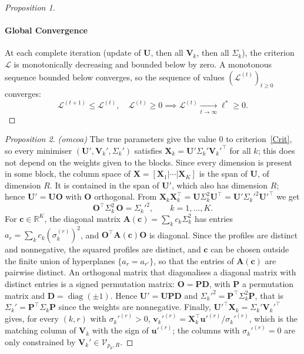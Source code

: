 \documentclass[11pt]{article}
\DeclareMathOperator{\diag}{diag}
\newcommand{\X}{\mathbf{X}}
\newcommand{\U}{\mathbf{U}}
\newcommand{\V}{\mathbf{V}}
\newcommand{\uu}{\mathbf{u}}
\newcommand{\vv}{\mathbf{v}}
\newcommand{\Stiefel}[2]{\mathcal V_{#1,#2}}
\begin{document}
\begin{proof}[Proposition 1]
\paragraph{Global Convergence} At each complete iteration (update of $\U$, then all $\V_k$, then all $\Sigma_k$), the criterion $\mathcal{L}$ is monotonically decreasing and bounded below by zero. A monotonous sequence bounded below converges, so the sequence of values $(\mathcal{L}^{(t)})_{t \geq 0}$
converges:
\[
  \mathcal{L}^{(t+1)} \leq \mathcal{L}^{(t)}, \quad \mathcal{L}^{(t)} \geq 0
  \implies
  \mathcal{L}^{(t)} \xrightarrow[t \to \infty]{} \ell^* \geq 0.
\]
\end{proof}

\begin{proof}[Proposition 2]
\emph{(omcoa)} The true parameters give the value $0$ to criterion~\eqref{Crit}, so
every minimiser $(\U',\V_k',\Sigma_k')$ satisfies
$\X_k=\U'\Sigma_k'\V_k'^\intercal$ for all $k$; this does not depend on the
weights given to the blocks. Since every dimension is present in some block,
the column space of $\X=[\X_1|\cdots|\X_K]$ is the span of $\U$, of dimension
$R$. It is contained in the span of $\U'$, which also has dimension $R$; hence
$\U'=\U\mathbf O$ with $\mathbf O$ orthogonal. From
$\X_k\X_k^\intercal=\U\Sigma_k^2\U^\intercal=\U'\Sigma_k'^2\U'^\intercal$ we get
\[
  \mathbf O^\intercal\Sigma_k^2\,\mathbf O=\Sigma_k'^2,\qquad k=1,\ldots,K .
\]
For $\mathbf c\in\mathbb R^K$, the diagonal matrix
$\mathbf A(\mathbf c)=\sum_k c_k\Sigma_k^2$ has entries
$a_r=\sum_k c_k(\sigma_k^{(r)})^2$, and $\mathbf O^\intercal\mathbf A(\mathbf c)\mathbf O$
is diagonal. Since the profiles are distinct and nonnegative, the squared
profiles are distinct, and $\mathbf c$ can be chosen outside the finite union
of hyperplanes $\{a_r=a_{r'}\}$, so that the entries of $\mathbf A(\mathbf c)$
are pairwise distinct. An orthogonal matrix that diagonalises a diagonal
matrix with distinct entries is a signed permutation matrix:
$\mathbf O=\mathbf P\mathbf D$, with $\mathbf P$ a permutation matrix and
$\mathbf D=\diag(\pm1)$. Hence $\U'=\U\mathbf P\mathbf D$ and
$\Sigma_k'^2=\mathbf P^\intercal\Sigma_k^2\mathbf P$, that is
$\Sigma_k'=\mathbf P^\intercal\Sigma_k\mathbf P$ since the weights are
nonnegative. Finally, $\U'^\intercal\X_k=\Sigma_k'\V_k'^\intercal$ gives, for
every $(k,r)$ with $\sigma_k'^{(r)}>0$,
$\vv_k'^{(r)}=\X_k^\intercal\uu'^{(r)}/\sigma_k'^{(r)}$, which is the matching
column of $\V_k$ with the sign of $\uu'^{(r)}$; the columns with
$\sigma_k'^{(r)}=0$ are only constrained by $\V_k'\in\Stiefel{p_k}{R}$.


\end{proof}
\end{document}

